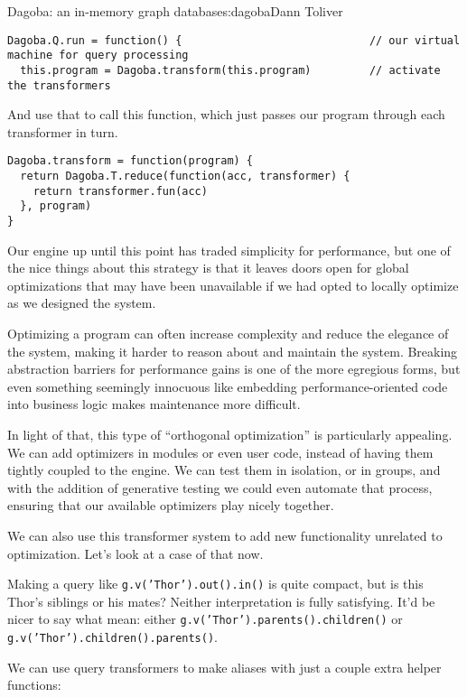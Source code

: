 \begin{aosachapter}{Dagoba: an in-memory graph database}{s:dagoba}{Dann Toliver}
\begin{verbatim}
Dagoba.Q.run = function() {                             // our virtual machine for query processing
  this.program = Dagoba.transform(this.program)         // activate the transformers
\end{verbatim}

And use that to call this function, which just passes our program
through each transformer in turn.

\begin{verbatim}
Dagoba.transform = function(program) {
  return Dagoba.T.reduce(function(acc, transformer) {
    return transformer.fun(acc)
  }, program)
}
\end{verbatim}

Our engine up until this point has traded simplicity for performance,
but one of the nice things about this strategy is that it leaves doors
open for global optimizations that may have been unavailable if we had
opted to locally optimize as we designed the system.

Optimizing a program can often increase complexity and reduce the
elegance of the system, making it harder to reason about and maintain
the system. Breaking abstraction barriers for performance gains is one
of the more egregious forms, but even something seemingly innocuous like
embedding performance-oriented code into business logic makes
maintenance more difficult.

In light of that, this type of ``orthogonal optimization'' is
particularly appealing. We can add optimizers in modules or even user
code, instead of having them tightly coupled to the engine. We can test
them in isolation, or in groups, and with the addition of generative
testing we could even automate that process, ensuring that our available
optimizers play nicely together.

We can also use this transformer system to add new functionality
unrelated to optimization. Let's look at a case of that now.

\label{aliases}

Making a query like \texttt{g.v('Thor').out().in()} is quite compact,
but is this Thor's siblings or his mates? Neither interpretation is
fully satisfying. It'd be nicer to say what mean: either
\texttt{g.v('Thor').parents().children()} or
\texttt{g.v('Thor').children().parents()}.

We can use query transformers to make aliases with just a couple extra
helper functions:


\end{aosachapter}
